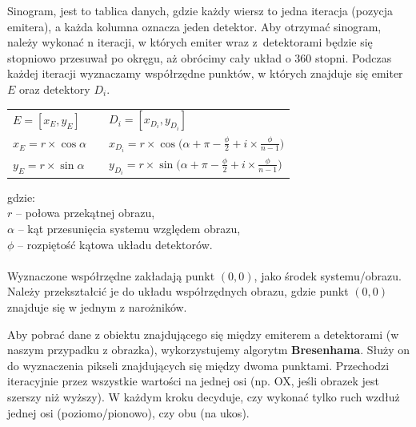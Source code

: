 \documentclass[polish,polish,a4paper]{article}
\begin{document}
				Sinogram, jest to tablica danych, 
				gdzie każdy wiersz to jedna iteracja (pozycja emitera), 
				a każda kolumna oznacza jeden detektor.
				Aby otrzymać sinogram, należy wykonać n iteracji, 
				w których emiter wraz z~detektorami będzie się stopniowo przesuwał po okręgu, 
				aż obrócimy cały układ o 360 stopni. 
				Podczas każdej iteracji wyznaczamy współrzędne punktów, w których znajduje się emiter $E$ oraz detektory $D_i$.
				\begin{center}
					\begin{tabular} {l l l}
						$ E = [ x_E, y_E ] $ 	& \hspace{2cm}	 &	$ D_i = [x_{D_i}, y_{D_i}] $
						\\
						$ x_E = r \times \cos{\alpha} $ 	& \hspace{2cm}	 &	 $ x_{D_i} = r \times \cos{\big(\alpha + \pi - \frac{\phi}{2} + i \times \frac{\phi}{n-1}\big)} $
						 \\ 
						$ y_E = r \times \sin{\alpha} $ 	& \hspace{2cm}	 &	 $ y_{D_i} =  r \times \sin{\big(\alpha + \pi - \frac{\phi}{2} + i \times \frac{\phi}{n-1}\big)}$ 
						\\
					\end{tabular}
				\end{center}
				gdzie: \\
				\indent $r$ -- połowa przekątnej obrazu, \\
				\indent $\alpha$ -- kąt przesunięcia systemu względem obrazu, \\
				\indent $\phi$ -- rozpiętość kątowa układu detektorów. \\ \\
				Wyznaczone współrzędne zakładają punkt $(0,0)$, jako środek systemu/obrazu.
				 Należy przekształcić je do układu współrzędnych obrazu,
				  gdzie punkt $(0,0)$ znajduje się w jednym z narożników.
				
				Aby pobrać dane z obiektu znajdującego się między emiterem a detektorami (w naszym przypadku z obrazka), wykorzystujemy algorytm \textbf{Bresenhama}. Służy on do wyznaczenia pikseli znajdujących się między dwoma punktami. Przechodzi iteracyjnie przez wszystkie wartości na jednej osi (np. OX, jeśli obrazek jest szerszy niż wyższy). W każdym kroku decyduje, czy wykonać tylko ruch wzdłuż jednej osi (poziomo/pionowo), czy obu (na ukos).
				
\end{document}
